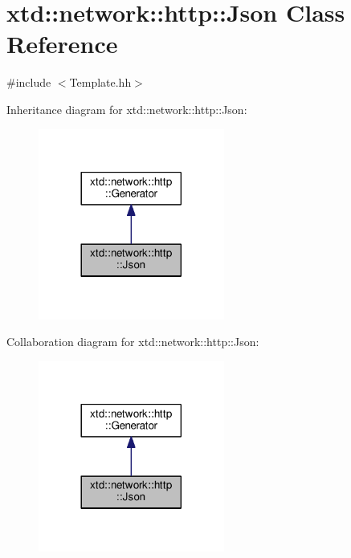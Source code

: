 \hypertarget{classxtd_1_1network_1_1http_1_1Json}{}\section{xtd\+:\+:network\+:\+:http\+:\+:Json Class Reference}
\label{classxtd_1_1network_1_1http_1_1Json}


{\ttfamily \#include $<$Template.\+hh$>$}



Inheritance diagram for xtd\+:\+:network\+:\+:http\+:\+:Json\+:
\nopagebreak
\begin{figure}[H]
\begin{center}
\leavevmode
\includegraphics[width=173pt]{classxtd_1_1network_1_1http_1_1Json__inherit__graph}
\end{center}
\end{figure}


Collaboration diagram for xtd\+:\+:network\+:\+:http\+:\+:Json\+:
\nopagebreak
\begin{figure}[H]
\begin{center}
\leavevmode
\includegraphics[width=173pt]{classxtd_1_1network_1_1http_1_1Json__coll__graph}
\end{center}
\end{figure}
